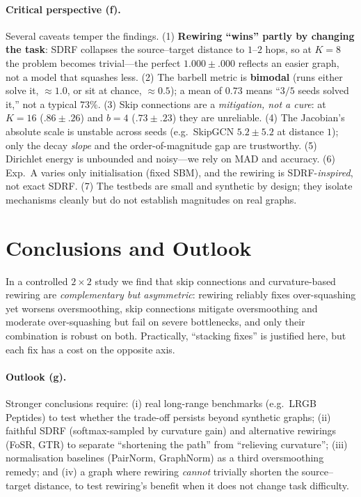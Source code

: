 \documentclass[10pt,a4paper]{article}
\begin{document}
\paragraph{Critical perspective (f).}
Several caveats temper the findings. (1) \textbf{Rewiring ``wins'' partly by
changing the task}: SDRF collapses the source--target distance to $1$--$2$ hops, so
at $K{=}8$ the problem becomes trivial---the perfect $1.000\pm.000$ reflects an
easier graph, not a model that squashes less. (2) The barbell metric is
\textbf{bimodal} (runs either solve it, $\approx1.0$, or sit at chance, $\approx0.5$);
a mean of $0.73$ means ``$3/5$ seeds solved it,'' not a typical $73\%$. (3) Skip
connections are a \emph{mitigation, not a cure}: at $K{=}16$ ($.86\pm.26$) and
$b{=}4$ ($.73\pm.23$) they are unreliable. (4) The Jacobian's absolute scale is
unstable across seeds (e.g.\ SkipGCN $5.2\pm5.2$ at distance $1$); only the decay
\emph{slope} and the order-of-magnitude gap are trustworthy. (5) Dirichlet energy is
unbounded and noisy---we rely on MAD and accuracy. (6) Exp.~A varies only
initialisation (fixed SBM), and the rewiring is SDRF-\emph{inspired}, not exact SDRF.
(7) The testbeds are small and synthetic by design; they isolate mechanisms cleanly
but do not establish magnitudes on real graphs.

\section{Conclusions and Outlook}
\label{sec:conclusion}

In a controlled $2\times2$ study we find that skip connections and curvature-based
rewiring are \emph{complementary but asymmetric}: rewiring reliably fixes
over-squashing yet worsens oversmoothing, skip connections mitigate oversmoothing
and moderate over-squashing but fail on severe bottlenecks, and only their
combination is robust on both. Practically, ``stacking fixes'' is justified here, but
each fix has a cost on the opposite axis.

\paragraph{Outlook (g).}
Stronger conclusions require: (i) real long-range benchmarks (e.g.\ LRGB
Peptides) to test whether the trade-off persists beyond synthetic graphs;
(ii) faithful SDRF (softmax-sampled by curvature gain) and alternative rewirings
(FoSR, GTR) to separate ``shortening the path'' from ``relieving curvature'';
(iii) normalisation baselines (PairNorm, GraphNorm) as a third oversmoothing remedy;
and (iv) a graph where rewiring \emph{cannot} trivially shorten the source--target
distance, to test rewiring's benefit when it does not change task difficulty.
\end{document}
